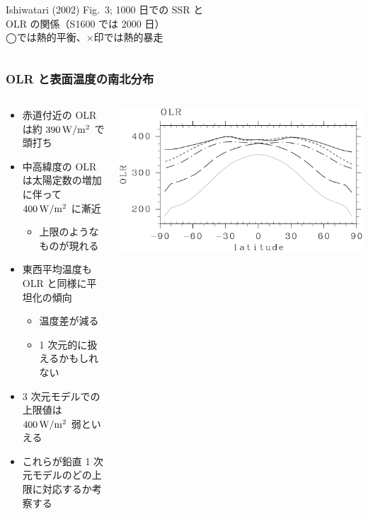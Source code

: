 \documentclass[aspectratio=149,9pt,fleqn]{beamer}
\begin{document}
\begin{frame}
\begin{columns}[T,onlytextwidth]
\begin{column}{.4\textwidth}
			Ishiwatari \etal (2002) Fig.~3; 1000 日での SSR と\\
			OLR の関係（S1600 では 2000 日）\\
			◯では熱的平衡、×印では熱的暴走
		\end{column}
	\end{columns}
\end{frame}

\begin{frame}
	\frametitle{OLR と表面温度の南北分布}
	\begin{columns}[T,onlytextwidth]
		\begin{column}{.55\textwidth}
			\begin{itemize}
				\item 赤道付近の OLR は約 \(390\hmu{W/m^2}\) で頭打ち
				\item 中高緯度の OLR は太陽定数の増加に伴って \(400\hmu{W/m^2}\) に漸近
					\begin{itemize}
						\item 上限のようなものが現れる
					\end{itemize}
				\item 東西平均温度も OLR と同様に平坦化の傾向
					\begin{itemize}
						\item 温度差が減る
						\item 1 次元的に扱えるかもしれない
					\end{itemize}
				\item 3 次元モデルでの上限値は \(400\hmu{W/m^2}\) 弱といえる
				\item これらが鉛直 1 次元モデルのどの上限に対応するか考察する
			\end{itemize}
		\end{column}
		\begin{column}{.4\textwidth}
			\centering
			\includegraphics[width=\textwidth]{./fig/OLR-meris.kps-crop.pdf}\\

\end{column}
\end{columns}
\end{frame}
\end{document}
